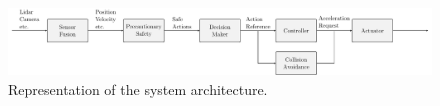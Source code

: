 \begin{figure}[h]
	\centering
	 \includegraphics[width=\linewidth]{YourThesis/chapters/figures/pomdp/figures-system_architecture.pdf}
%
%		
%
%		
%
%
	\caption{Representation of the system architecture.}
	\label{fig:system_architecture}
\end{figure}

